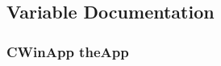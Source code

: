 \subsection{Variable Documentation}
\hypertarget{garmin-serial_8cpp_a39731e78dd022bcb54630b0250cbc964}{
\subsubsection[{theApp}]{\setlength{\rightskip}{0pt plus 5cm}CWinApp {\bf theApp}}}
\label{garmin-serial_8cpp_a39731e78dd022bcb54630b0250cbc964}
